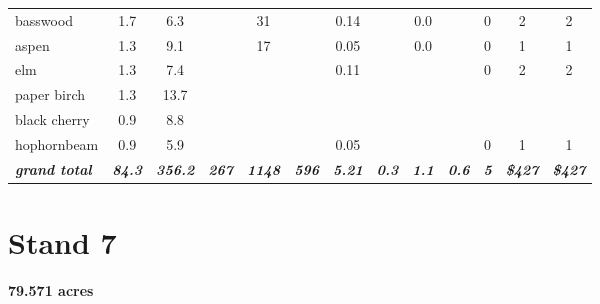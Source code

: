 \documentclass[landscape]{article}
\begin{document}
\begin{table}[H]
\begin{tabular}[t]{lcccccccccccc}
basswood & 1.7 & 6.3 &  & 31 &  & 0.14 &  & 0.0 &  & 0 & 2 & 2\\
 
\rowcolor{gray!6}  aspen & 1.3 & 9.1 &  & 17 &  & 0.05 &  & 0.0 &  & 0 & 1 & 1\\
 
elm & 1.3 & 7.4 &  &  &  & 0.11 &  &  &  & 0 & 2 & 2\\
 
\rowcolor{gray!6}  paper birch & 1.3 & 13.7 &  &  &  &  &  &  &  &  &  & \\
 
black cherry & 0.9 & 8.8 &  &  &  &  &  &  &  &  &  & \\
 
\rowcolor{gray!6}  hophornbeam & 0.9 & 5.9 &  &  &  & 0.05 &  &  &  & 0 & 1 & 1\\
 
\rowcolor[HTML]{DCDCDC}  \em{\textbf{grand total}} & \em{\textbf{84.3}} & \em{\textbf{356.2}} & \em{\textbf{267}} & \em{\textbf{1148}} & \em{\textbf{596}} & \em{\textbf{5.21}} & \em{\textbf{0.3}} & \em{\textbf{1.1}} & \em{\textbf{0.6}} & \em{\textbf{5}} & \em{\textbf{\$427}} & \em{\textbf{\$427}}\\
\bottomrule
\end{tabular}
\end{table}

\pagebreak

\section{Stand 7}\label{stand-7}

\textbf{79.571 acres}
\end{document}
